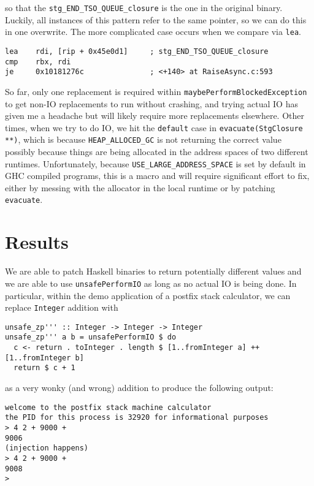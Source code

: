 \documentclass[letterpaper]{article}
\begin{document}
so that the \texttt{stg_END_TSO_QUEUE_closure} is the one in the original
binary. Luckily, all instances of this pattern refer to the same pointer, so we
can do this in one overwrite. The more complicated case occurs when we compare
via \texttt{lea}.

\begin{verbatim}
lea    rdi, [rip + 0x45e0d1]     ; stg_END_TSO_QUEUE_closure
cmp    rbx, rdi
je     0x10181276c               ; <+140> at RaiseAsync.c:593
\end{verbatim}

So far, only one replacement is required within
\texttt{maybePerformBlockedException} to get non-IO replacements to run
without crashing, and trying actual IO has given me a headache but will likely
require more replacements elsewhere. Other times, when we try to do IO, we hit
the \texttt{default} case in \texttt{evacuate(StgClosure **)},
which is because \texttt{HEAP_ALLOCED_GC} is not returning the correct
value possibly because things are being allocated in the address spaces of two
different runtimes. Unfortunately, because
\texttt{USE_LARGE_ADDRESS_SPACE} is set by default in GHC compiled
programs, this is a macro and will require significant effort to fix, either by
messing with the allocator in the local runtime or by patching
\texttt{evacuate}.

\section{Results}

We are able to patch Haskell binaries to return potentially different values and
we are able to use \texttt{unsafePerformIO} as long as no actual IO
is being done. In particular, within the demo application of a postfix stack
calculator, we can replace \texttt{Integer} addition with

\begin{verbatim}
unsafe_zp''' :: Integer -> Integer -> Integer
unsafe_zp''' a b = unsafePerformIO $ do
  c <- return . toInteger . length $ [1..fromInteger a] ++ [1..fromInteger b]
  return $ c + 1
\end{verbatim}

as a very wonky (and wrong) addition to produce the following output:

\begin{verbatim}
welcome to the postfix stack machine calculator
the PID for this process is 32920 for informational purposes
> 4 2 + 9000 +
9006
(injection happens)
> 4 2 + 9000 +
9008
>
\end{verbatim}
\end{document}
